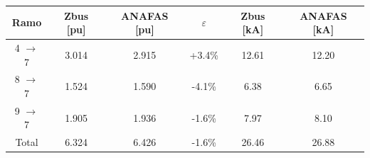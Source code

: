 \begin{tabular}{cccccc}
\toprule
Ramo & Zbus [pu] & ANAFAS [pu] & $\varepsilon$ & Zbus [kA] & ANAFAS [kA] \\
\midrule
4 $\to$ 7 & 3.014 & 2.915 & +3.4\% & 12.61 & 12.20 \\
8 $\to$ 7 & 1.524 & 1.590 & -4.1\% & 6.38 & 6.65 \\
9 $\to$ 7 & 1.905 & 1.936 & -1.6\% & 7.97 & 8.10 \\
\midrule Total & 6.324 & 6.426 & -1.6\% & 26.46 & 26.88 \\
\bottomrule
\end{tabular}
